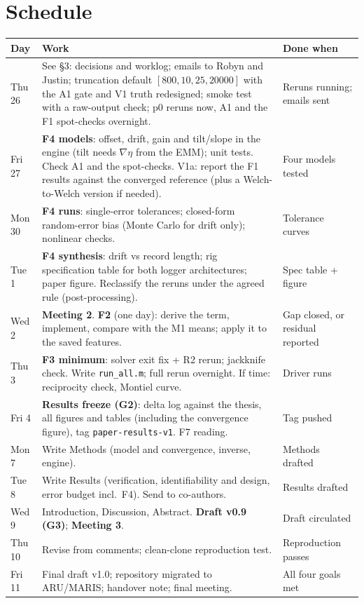 \documentclass[10pt,a4paper]{article}
\begin{document}
\section{Schedule}
\begin{center}\small
{}
\begin{tabularx}{\linewidth}{@{}l L L@{}}
\toprule
Day & Work & Done when \\
\midrule
Thu 26 & See \S3: decisions and worklog; emails to Robyn and Justin; truncation default $[800,10,25,20000]$ with the A1 gate and V1 truth redesigned; smoke test with a raw-output check; p0 reruns now, A1 and the F1 spot-checks overnight. & Reruns running; emails sent \\
Fri 27 & \textbf{F4 models}: offset, drift, gain and tilt/slope in the engine (tilt needs $\nabla\eta$ from the EMM); unit tests. Check A1 and the spot-checks. V1a: report the F1 results against the converged reference (plus a Welch-to-Welch version if needed). & Four models tested \\
Mon 30 & \textbf{F4 runs}: single-error tolerances; closed-form random-error bias (Monte Carlo for drift only); nonlinear checks. & Tolerance curves \\
Tue 1 & \textbf{F4 synthesis}: drift vs record length; rig specification table for both logger architectures; paper figure. Reclassify the reruns under the agreed rule (post-processing). & Spec table + figure \\
Wed 2 & \textbf{Meeting 2}. \textbf{F2} (one day): derive the term, implement, compare with the M1 means; apply it to the saved features. & Gap closed, or residual reported \\
Thu 3 & \textbf{F3 minimum}: solver exit fix + R2 rerun; jackknife check. Write \texttt{run\_all.m}; full rerun overnight. If time: reciprocity check, Montiel curve. & Driver runs \\
Fri 4 & \textbf{Results freeze (G2)}: delta log against the thesis, all figures and tables (including the convergence figure), tag \texttt{paper-results-v1}. F7 reading. & Tag pushed \\
Mon 7 & Write Methods (model and convergence, inverse, engine). & Methods drafted \\
Tue 8 & Write Results (verification, identifiability and design, error budget incl.\ F4). Send to co-authors. & Results drafted \\
Wed 9 & Introduction, Discussion, Abstract. \textbf{Draft v0.9 (G3)}; \textbf{Meeting 3}. & Draft circulated \\
Thu 10 & Revise from comments; clean-clone reproduction test. & Reproduction passes \\
Fri 11 & Final draft v1.0; repository migrated to ARU/MARIS; handover note; final meeting. & All four goals met \\
\bottomrule
\end{tabularx}
\end{center}
\end{document}
